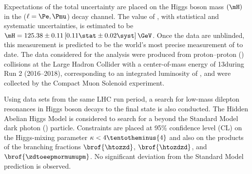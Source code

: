 % 
Expectations of the total uncertainty are placed on the Higgs boson mass $(\mH)$ in the \hzzfourl ($\ell = \Pe, \Pmu$) decay channel.
The value of \mH, with statistical and systematic uncertainties, is estimated to be $\mH = 125.38 \pm 0.11\left[0.11\stat \pm 0.02\syst \right]\GeV$.
Once the data are unblinded, this measurement is predicted to be the world's most precise measurement of \mH to date.
The data considered for the analysis were produced from proton--proton (\pp) collisions at the Large Hadron Collider with a center-of-mass energy of 13\TeV during Run 2 (2016--2018), corresponding to an integrated luminosity of \lumiruntwo, and were collected by the Compact Muon Solenoid experiment.

Using data sets from the same LHC run period, a search for low-mass dilepton resonances in Higgs boson decays to the \fourl final state is also conducted.
The Hidden Abelian Higgs Model is considered to search for a beyond the Standard Model dark photon (\PZD) particle.
Constraints are placed at 95\% confidence level (CL) on the Higgs-mixing parameter $\kappa < 4\tentotheminus{4}$ and also on the products of the branching fractions $\brof{\htozzd}$, $\brof{\htozdzd}$, and $\brof{\zdtoeepmormumupm}$.
No significant deviation from the Standard Model prediction is observed.

